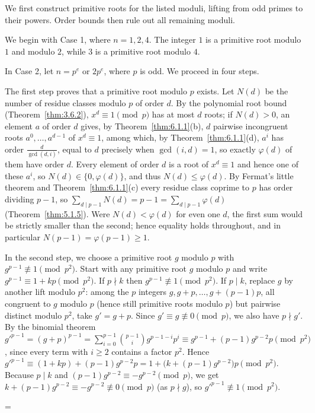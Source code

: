 \documentclass[11pt]{article}
\makeatletter
\let\nt@closedisplay\]
\def\nt@guardedclose{\@ifnextchar\par{\nt@closeafterpar}{\@ifnextchar\end{\postdisplaypenalty\@M\nt@closedisplay}{\nt@closedisplay}}}
\def\nt@closeafterpar\par{\@ifnextchar\par{\nt@closeafterpar}{\@ifnextchar\end{\postdisplaypenalty\@M\nt@closedisplay\par}{\nt@closedisplay\par}}}
\renewenvironment{proof}[1][\proofname]{\par
  \pushQED{\qed}\normalfont\topsep\medskipamount\edef\nt@afterproof{\@endparpenalty=\the\@endparpenalty\relax}\@beginparpenalty\@M\@endparpenalty\@M\let\]\nt@guardedclose\trivlist\item[]\textit{#1\@addpunct{.}} \ignorespaces}{\ifvmode\addpenalty\@M\fi\popQED\nt@afterproof\endtrivlist\@endpefalse}
\theoremstyle{ntstyle}
\makeatother
\begin{document}
\begin{proof}
  We first construct primitive roots for the listed moduli, lifting from odd
  primes to their powers. Order bounds then rule out all remaining moduli.

  We begin with Case 1, where $n = 1, 2, 4$. The integer $1$ is a primitive root
  modulo $1$ and modulo $2$, while $3$ is a primitive root modulo $4$.

  In Case 2, let $n = p^{e}$ or $2p^{e}$, where $p$ is odd. We proceed in four steps.

  The first step proves that a primitive root modulo $p$ exists. Let $N(d)$ be the number
  of residue classes modulo $p$ of order $d$. By the polynomial root bound (Theorem~\ref{thm:3.6.2}),
  $x^d\equiv1\pmod{p}$ has at most $d$ roots; if $N(d) > 0$, an element $a$ of
  order $d$ gives, by Theorem~\ref{thm:6.1.1}(b), $d$ pairwise incongruent roots $a^{0}, \ldots, a^{d-1}$ of
  $x^{d} \equiv 1$, among which, by Theorem~\ref{thm:6.1.1}(d), $a^{i}$ has order
  $\tfrac{d}{\gcd(d, i)}$, equal to $d$ precisely when $\gcd(i, d) = 1$,
  so exactly $\varphi(d)$ of them have order $d$. Every element of
  order $d$ is a root of $x^{d} \equiv 1$ and hence one of these
  $a^{i}$, so $N(d) \in \{0, \varphi(d)\}$, and thus $N(d) \le \varphi(d)$. By Fermat's little theorem and
  Theorem~\ref{thm:6.1.1}(c) every
  residue class coprime to $p$ has order dividing $p-1$, so
  $\sum_{d \mid p-1} N(d) = p - 1 = \sum_{d \mid p-1}\varphi(d)$ (Theorem~\ref{thm:5.1.5}). Were
  $N(d) < \varphi(d)$ for even one $d$, the first
  sum would be strictly smaller than the second; hence equality holds
  throughout, and in particular $N(p-1) = \varphi(p-1) \ge 1$.

  In the second step, we choose a primitive root $g$ modulo $p$ with $g^{p-1} \not\equiv 1 \pmod{p^2}$. Start with
  any primitive root $g$ modulo $p$ and write
  $g^{p-1} \equiv 1 + kp \pmod{p^2}$. If $p \nmid k$ then $g^{p-1} \not\equiv 1 \pmod{p^2}$. If $p \mid k$, replace
  $g$ by another lift
  modulo $p^2$: among the $p$ integers $g, g+p, \ldots, g+(p-1)p$, all
  congruent to $g$ modulo $p$ (hence still primitive roots modulo $p$)
  but pairwise distinct modulo $p^2$, take $g' = g + p$. Since $g' \equiv g \not\equiv 0 \pmod{p}$, we
  also have $p \nmid g'$. By the binomial theorem
  $g'^{p-1} = (g+p)^{p-1} = \sum_{i=0}^{p-1} \binom{p-1}{i} g^{p-1-i} p^{i} \equiv g^{p-1} + (p-1) g^{p-2} p \pmod{p^2}$,
  since every term with $i \ge 2$ contains a factor
  $p^{2}$. Hence $g'^{p-1} \equiv (1 + kp) + (p-1) g^{p-2} p = 1 + \big(k + (p-1) g^{p-2}\big) p \pmod{p^2}$.
  Because $p \mid k$ and
  $(p-1) g^{p-2} \equiv -g^{p-2} \pmod{p}$, we get $k + (p-1) g^{p-2} \equiv -g^{p-2} \not\equiv 0 \pmod{p}$ (as
  $p \nmid g$), so $g'^{p-1} \not\equiv 1 \pmod{p^2}$.


\end{proof}
\end{document}
